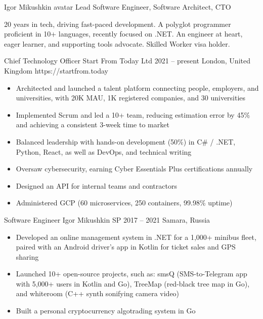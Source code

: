 \begin{paracol}{2}
\cvHeader%
    {Igor Mikushkin}
    {avatar}
    {Lead Software Engineer, Software Architect, CTO}

20 years in tech, driving fast-paced development.
A polyglot programmer proficient in 10+ languages, recently focused on .NET\@.
An engineer at heart, eager learner, and supporting tools advocate.
Skilled Worker visa holder.

    \cvLeftEvent%
        {Chief Technology Officer}
        {Start From Today Ltd}
        {2021 -- present}
        {London, United Kingdom}
        {https://startfrom.today}

        \begin{itemize}
            \item Architected and launched a talent platform connecting people, employers, and universities,
                  with 20K MAU, 1K registered companies, and 30 universities
            \item Implemented Scrum and led a 10+ team,
                  reducing estimation error by 45\%
                  and achieving a consistent 3-week time to market
            \item Balanced leadership with hands-on development (50\%)
                  in C\# / .NET, Python, React, as well as DevOps, and technical writing
            \item Oversaw cybersecurity, earning Cyber Essentials Plus certifications annually
            \item Designed an API for internal teams and contractors
            \item Administered GCP (60 microservices, 250 containers, 99.98\% uptime)
        \end{itemize}

    \cvLeftEvent%
        {Software Engineer}
        {Igor Mikushkin SP}
        {2017 -- 2021}
        {Samara, Russia}
        {}

        \begin{itemize}
            \item Developed an online management system in .NET for a 1,000+ minibus fleet,
                  paired with an Android driver’s app in Kotlin for ticket sales and GPS sharing
            \item Launched 10+ open-source projects, such as:
                  smsQ (SMS-to-Telegram app with 5,000+ users in Kotlin and Go),
                  TreeMap (red-black tree map in Go),
                  and whiteroom (C++ synth sonifying camera video)
            \item Built a personal cryptocurrency algotrading system in Go
        \end{itemize}


\end{paracol}
